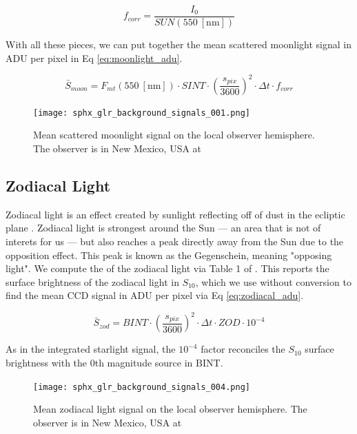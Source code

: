 \begin{equation} \label{eq:krag_f_corr}
  f_{corr} = \frac{I_0}{SUN(550 \: \left[\textrm{nm}\right])}
\end{equation}

With all these pieces, we can put together the mean scattered moonlight signal in ADU per pixel in Eq \ref{eq:moonlight_adu}.

\begin{equation} \label{eq:moonlight_adu}
  \bar{S}_{moon} = F_{mt}(550 \: \left[\textrm{nm}\right]) \cdot SINT \cdot \left( \frac{s_{pix}}{3600} \right)^2 \cdot \Delta t \cdot f_{corr}
\end{equation}

\begin{figure}[ht]
  \centering
  \texttt{[image: sphx\_glr\_background\_signals\_001.png]}
  \caption{Mean scattered moonlight signal on the local observer hemisphere. The observer is in New Mexico, USA at
  \pogslla}
  \label{fig:moonlight_hemi}
\end{figure}

\subsection{Zodiacal Light}

Zodiacal light is an effect created by sunlight reflecting off of dust in the ecliptic plane \cite{krag2003}. Zodiacal light is strongest around the Sun --- an area that is not of interets for us --- but also reaches a peak directly away from the Sun due to the opposition effect. This peak is known as the Gegenschein, meaning "opposing light". We compute the of the zodiacal light via Table 1 of \cite{roach1972}. This reports the surface brightness of the zodiacal light in $S_{10}$, which we use without conversion to find the mean CCD signal in ADU per pixel via Eq \ref{eq:zodiacal_adu}.

\begin{equation} \label{eq:zodiacal_adu}
  \bar{S}_{zod} = BINT \cdot \left( \frac{s_{pix}}{3600} \right)^2 \cdot \Delta t \cdot ZOD \cdot 10^{-4}
\end{equation}

As in the integrated starlight signal, the $10^{-4}$ factor reconciles the $S_{10}$ surface brightness with the 0th magnitude source in $\textrm{BINT}$. 

\begin{figure}[ht]
  \centering
  \texttt{[image: sphx\_glr\_background\_signals\_004.png]}
  \caption{Mean zodiacal light signal on the local observer hemisphere. The observer is in New Mexico, USA at
  \pogslla}
  \label{fig:zod_hemi}
\end{figure}

